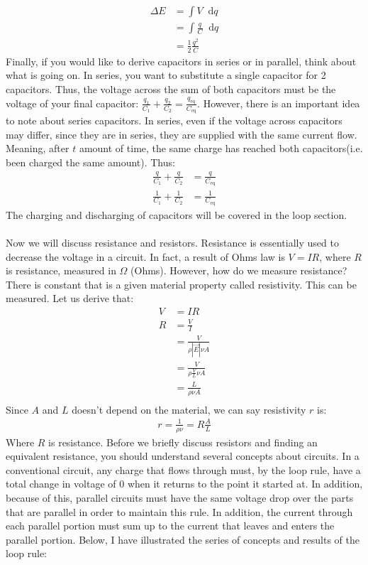 \documentclass{article}
\newcommand*\dif{\mathop{}\!\mathrm{d}}
\begin{document}
\begin{align*}
\Delta E &= \int V \dif q\\
&= \int \frac{q}{C} \dif q\\
&= \frac{1}{2}\frac{q^2}{C}
\end{align*}
Finally, if you would like to derive capacitors in series or in parallel, think about what is going on. In series, you want to substitute a single capacitor for 2 capacitors. Thus, the voltage across the sum of both capacitors must be the voltage of your final capacitor: $\frac{q_1}{C_1} + \frac{q_2}{C_2} = \frac{q_{\text{eq}}}{C_\text{eq}}$. However, there is an important idea to note about series capacitors. In series, even if the voltage across capacitors may differ, since they are in series, they are supplied with the same current flow. Meaning, after $t$ amount of time, the same charge has reached both capacitors(i.e. been charged the same amount). Thus:
\begin{align*}
\frac{q}{C_1} + \frac{q}{C_2} &= \frac{q}{C_\text{eq}}\\
\frac{1}{C_1} + \frac{1}{C_2} &= \frac{1}{C_\text{eq}}
\end{align*}
The charging and discharging of capacitors will be covered in the loop section. 
\\ 
\\
Now we will discuss resistance and resistors. Resistance is essentially used to decrease the voltage in a circuit. In fact, a result of Ohms law is $V = IR$, where $R$ is resistance, measured in $\Omega$ (Ohms). However, how do we measure resistance? There is constant that is a given material property called resistivity. This can be measured. Let us derive that:
\begin{align*}
V &= IR\\
R &= \frac{V}{I}\\
&= \frac{V}{\rho |\vec{E}|\nu A}\\
&= \frac{V}{\rho \frac{V}{L}\nu A}\\
&= \frac{L}{\rho\nu A}\\
\end{align*}
Since $A$ and $L$ doesn't depend on the material, we can say resistivity $r$ is:
\begin{align*}
r = \frac{1}{\rho \nu} = R\frac{A}{L}
\end{align*}
Where $R$ is resistance. Before we briefly discuss resistors and finding an equivalent resistance, you should understand several concepts about circuits. In a conventional circuit, any charge that flows through must, by the loop rule, have a total change in voltage of $0$ when it returns to the point it started at. In addition, because of this, parallel circuits must have the same voltage drop over the parts that are parallel in order to maintain this rule. In addition, the current through each parallel portion must sum up to the current that leaves and enters the parallel portion. Below, I have illustrated the series of concepts and results of the loop rule:
\end{document}
